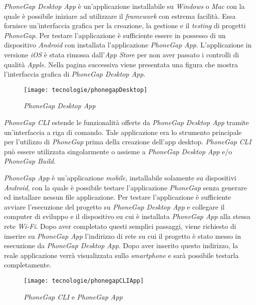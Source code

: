 \textit{PhoneGap Desktop App} è un'applicazione installabile su \textit{Windows} o \textit{Mac} con la quale è possibile iniziare ad utilizzare il \textit{framework} con estrema facilità. Essa fornisce un'interfaccia grafica per la creazione, la gestione e il \textit{testing} di progetti \textit{PhoneGap}. Per testare l'applicazione è sufficiente essere in possesso di un dispositivo \textit{Android} con installata l'applicazione \textit{PhoneGap App}. L'applicazione in versione \textit{iOS} è stata rimossa dall'\textit{App Store} per non aver passato i controlli di qualità \textit{Apple}. Nella pagina successiva viene presentata una figura che mostra l'interfaccia grafica di \textit{PhoneGap Desktop App}.

\begin{figure}[!h] 
    \centering 
    \texttt{[image: tecnologie/phonegapDesktop]} 
    \caption{\textit{PhoneGap Desktop App}}
\end{figure}

\newpage

\textit{PhoneGap CLI} estende le funzionalità offerte da \textit{PhoneGap Desktop App} tramite un'interfaccia a riga di comando. Tale applicazione era lo strumento principale per l'utilizzo di \textit{PhoneGap} prima della creazione dell'app desktop. \textit{PhoneGap CLI} può essere utilizzata singolarmente o assieme a \textit{PhoneGap Desktop App} e/o \textit{PhoneGap Build}.

\textit{PhoneGap App} è un'applicazione \textit{mobile}, installabile solamente su dispositivi \textit{Android}, con la quale è possibile testare l'applicazione \textit{PhoneGap} senza generare ed installare nessun file applicazione. Per testare l'applicazione è sufficiente avviare l'esecuzione del progetto su \textit{PhoneGap Desktop App} e collegare il computer di sviluppo e il dispositivo su cui è installata \textit{PhoneGap App} alla stessa rete \textit{Wi-Fi}. Dopo aver completato questi semplici passaggi, viene richiesto di inserire su \textit{PhoneGap App} l'indirizzo di rete su cui il progetto è stato messo in esecuzione da \textit{PhoneGap Desktop App}. Dopo aver inserito questo indirizzo, la reale applicazione verrà visualizzata sullo \textit{smartphone} e sarà possibile testarla completamente.

\begin{figure}[!h] 
    \centering 
    \texttt{[image: tecnologie/phonegapCLIApp]} 
    \caption{\textit{PhoneGap CLI} e \textit{PhoneGap App}}
\end{figure}

